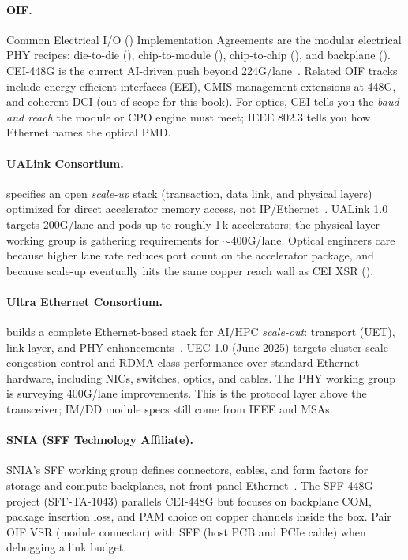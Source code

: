 \paragraph{OIF.} Common Electrical I/O () Implementation Agreements are
the modular electrical PHY recipes: die-to-die (), chip-to-module
(), chip-to-chip (), and backplane (). CEI-448G is
the current AI-driven push beyond 224G/lane~. Related OIF tracks
include energy-efficient interfaces (EEI), CMIS management extensions at 448G,
and coherent DCI (out of scope for this book). For optics, CEI tells you the
\emph{baud and reach} the module or CPO engine must meet; IEEE 802.3 tells you
how Ethernet names the optical PMD.

\paragraph{UALink Consortium.}  specifies an open \emph{scale-up}
stack (transaction, data link, and physical layers) optimized for direct
accelerator memory access, not IP/Ethernet~. UALink
1.0 targets 200G/lane and pods up to roughly 1\,k accelerators; the physical-layer
working group is gathering requirements for $\sim$400G/lane. Optical engineers
care because higher lane rate reduces port count on the accelerator package, and
because scale-up eventually hits the same copper reach wall as CEI XSR
().

\paragraph{Ultra Ethernet Consortium.}  builds a complete Ethernet-based
stack for AI/HPC \emph{scale-out}: transport (UET), link layer, and PHY
enhancements~. UEC 1.0 (June 2025) targets cluster-scale
congestion control and RDMA-class performance over standard Ethernet hardware,
including NICs, switches, optics, and cables. The PHY working group is surveying
400G/lane improvements. This is the protocol layer above the transceiver; IM/DD
module specs still come from IEEE and MSAs.

\paragraph{SNIA (SFF Technology Affiliate).} SNIA's SFF working group defines
connectors, cables, and form factors for storage and compute backplanes, not
front-panel Ethernet~. The SFF 448G project
(SFF-TA-1043) parallels CEI-448G but focuses on backplane COM, package insertion
loss, and PAM choice on copper channels inside the box. Pair OIF VSR (module
connector) with SFF (host PCB and PCIe cable) when debugging a link budget.

